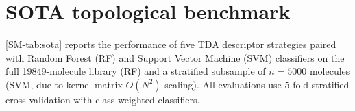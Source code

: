 \documentclass[11pt,a4paper]{article}
\begin{document}

\section{SOTA topological benchmark}
\label{SM-sec:sota_benchmark}

\cref{SM-tab:sota} reports the performance of five TDA descriptor strategies paired with Random Forest (RF) and Support Vector Machine (SVM) classifiers on the full \num{19849}-molecule library (RF) and a stratified subsample of $n = \num{5000}$ molecules (SVM, due to kernel matrix $O(N^2)$ scaling). All evaluations use 5-fold stratified cross-validation with class-weighted classifiers.
\end{document}
